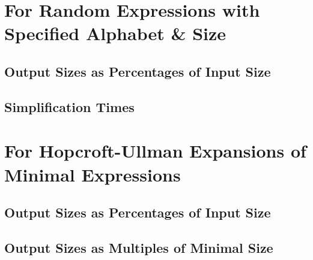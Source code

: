 \documentclass[a4paper]{article}
\begin{document}
\section{For Random Expressions with Specified Alphabet \& Size}
\subsection{Output Sizes as Percentages of Input Size}

\subsection{Simplification Times}

\section{For Hopcroft-Ullman Expansions of Minimal Expressions}
\subsection{Output Sizes as Percentages of Input Size}

\subsection{Output Sizes as Multiples of Minimal Size}

\end{document}
